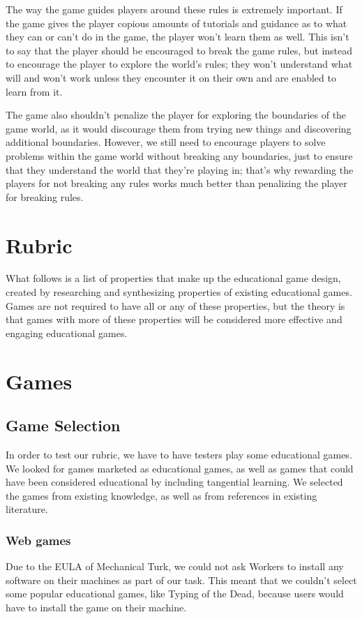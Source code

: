 \documentclass[12pt]{report}
\begin{document}
		The way the game guides players around these rules is extremely important. If the game gives the player copious amounts of tutorials and guidance as to what they can or can't do in the game, the player won't learn them as well. This isn't to say that the player should be encouraged to break the game rules, but instead to encourage the player to explore the world's rules; they won't understand what will and won't work unless they encounter it on their own and are enabled to learn from it.
	
		The game also shouldn't penalize the player for exploring the boundaries of the game world, as it would discourage them from trying new things and discovering additional boundaries. However, we still need to encourage players to solve problems within the game world without breaking any boundaries, just to ensure that they understand the world that they're playing in; that's why rewarding the players for not breaking any rules works much better than penalizing the player for breaking rules.

\section{Rubric}
	What follows is a list of properties that make up the educational game design, created by researching and synthesizing properties of existing educational games. Games are not required to have all or any of these properties, but the theory is that games with more of these properties will be considered more effective and engaging educational games.



\section{Games}
	\subsection{Game Selection}
		In order to test our rubric, we have to have testers play some educational games. We looked for games marketed as educational games, as well as games that could have been considered educational by including tangential learning. We selected the games from existing knowledge, as well as from references in existing literature.

		\subsubsection{Web games}
			Due to the EULA of Mechanical Turk, we could not ask Workers to install any software on their machines as part of our task. This meant that we couldn't select some popular educational games, like Typing of the Dead, because users would have to install the game on their machine.
\end{document}
